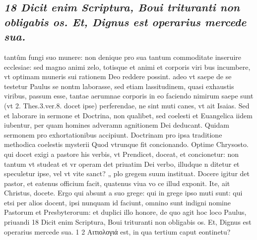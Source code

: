 \documentclass{article}
\begin{document}
\begin{pages}
\subsection*{\textit{18 Dicit enim Scriptura, Boui trituranti non obligabis os. Et, Dignus est operarius mercede sua.}}tantûm fungi suo munere: non denique pro sua tantum commoditate inseruire ecclesiae: sed magno animi zelo, totisque et animi et corporis viri bus incumbere, vt optimam muneris sui rationem Deo reddere possint. adeo vt saepe de se testetur Paulus se nontm laborasse, sed etiam lassitudinem, quasi exhaustis viribus, passum esse, tantae aerumnae corporis in eo faciendo nimirum saepe sunt (vt 2. Thes.3.ver.8. docet ipse) perferendae, ne sint muti canes, vt ait Isaias. Sed et laborare in sermone et Doctrina, non qualibet, sed coelesti et Euangelica iidem iubentur, per quam homines adveramn agnitionem Dei deducant. Quidam sermonem pro exhortationibus accipiunt. Doctrinam pro ipsa traditione methodica coelestis mysterii Quod vtrunque fit concionando. Optime Chrysosto. qui docet exigi a pastore his verbis, vt Prendicet, doceat, et concionetur: non tantum vt studeat et vr operam det priuatim Dei verbo, illudque n ditetur et speculetur ipse, vel vt vite sanct? „ plo gregem suum instituat. Docere igitur det pastor, et eatenus officium facit, quatenus viua vo ce illud exponit. Ite, ait Christus, docete. Ergo qui absunt a suo grege: qui in grege ipso muti sunt: qui etsi per alios docent, ipsi nunquam id faciunt, omnino sunt indigni nomine Pastorum et Presbyterorum: et duplici illo honore, de quo agit hoc loco Paulus, priuandi 18 Dicit enim Scriptura, Boui trituranti non obligabis os. Et, Dignus est operarius mercede sua. 1 2 Αιτιολογιά est, in qua tertium caput eontinetu?  \pend

\end{pages}
\end{document}

